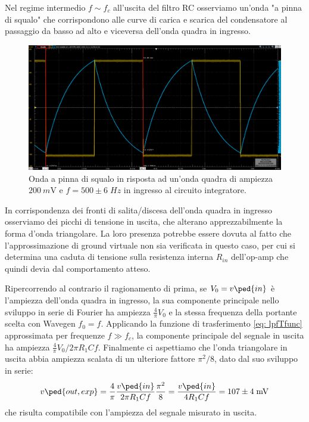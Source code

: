 \documentclass[10pt,a4paper]{article}
\begin{document}
Nel regime intermedio $f \sim f_c$ all'uscita del filtro RC osserviamo un'onda
"a pinna di squalo" che corrispondono alle curve di carica e scarica del
condensatore al passaggio da basso ad alto e viceversa dell'onda quadra in
ingresso.
\begin{figure}[htbp]
\centering
\includegraphics[scale=0.335]{intfin}
\caption{Onda a pinna di squalo in risposta ad un'onda quadra di ampiezza
$\SI{200}{m\V}$ e $f = 500 \pm 6 \; \si{Hz}$ in ingresso al circuito
integratore. \label{fig: intfin}}
\end{figure}

In corrispondenza dei fronti di salita/discesa dell'onda quadra in ingresso
osserviamo dei picchi di tensione in uscita, che alterano apprezzabilmente
la forma d'onda triangolare. La loro presenza potrebbe essere dovuta al fatto
che l'approssimazione di ground virtuale non sia verificata in questo caso,
per cui si determina una caduta di tensione sulla resistenza interna $R_{in}$
dell'op-amp che quindi devia dal comportamento atteso.

Ripercorrendo al contrario il ragionamento di prima, se $V_0 = v\ped{in}$ è
l'ampiezza dell'onda quadra in ingresso, la sua componente principale nello
sviluppo in serie di Fourier ha ampiezza $\frac{4}{\pi} V_0$ e la stessa
frequenza della portante scelta con Wavegen $f_0 = f$.
Applicando la funzione di trasferimento \eqref{eq: lpfTfunc} approssimata per
frequenze $f \gg f_c$, la componente principale del segnale in uscita ha
ampiezza $\frac{4}{\pi} V_0 / 2\pi R_1 C f$. Finalmente ci aspettiamo che
l'onda triangolare in uscita abbia ampiezza scalata di un ulteriore fattore
$\pi^2/8$, dato dal suo sviluppo in serie:
\[
v\ped{out, exp} = \frac{4}{\pi} \frac{v\ped{in}}{2 \pi R_1 C f} \frac{\pi^2}{8} =
\frac{v\ped{in}}{4 R_1 C f} = 107 \pm 4 \; \si{m\V}
\]
che risulta compatibile con l'ampiezza del segnale misurato in uscita.
\end{document}
